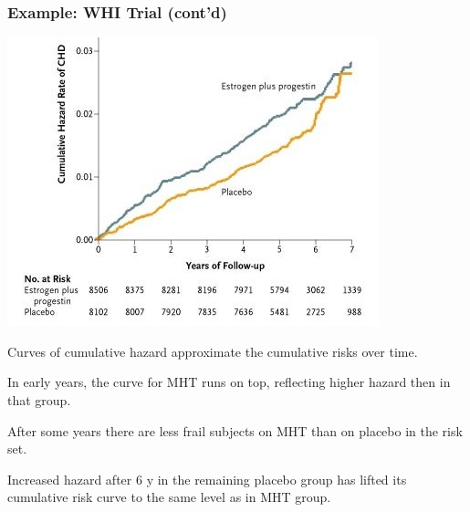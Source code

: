 \documentclass[12pt,dvipsnames,t,aspectratio=169, handout%
]{beamer}
\begin{document}
\begin{frame}
\frametitle{\large Example: WHI Trial (cont'd)}

\begin{minipage}[b]{0.57\linewidth}
\includegraphics[width=\textwidth]{whi-on-mht-chd}
\end{minipage}
\hfill
\begin{minipage}[b]{0.42\linewidth}
{\small
\raggedright
\bi
\item
Curves of cumulative hazard approximate
the cumulative risks over time.
\item
In early years,
the curve for MHT runs on top, reflecting
higher hazard then in that group.
\item
After some years there are less frail
subjects on MHT than on placebo
in the risk set.
\item
Increased hazard after 6 y in the remaining
placebo group has lifted its cumulative risk
curve to the same level as in MHT group.
\ei
}
\end{minipage}
\end{frame}
\end{document}
